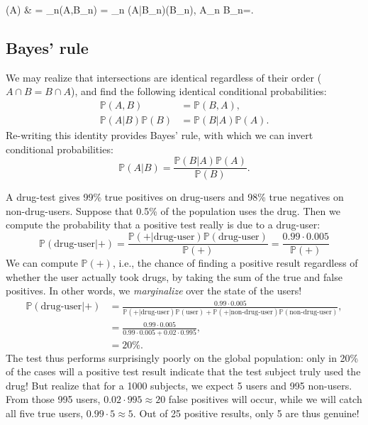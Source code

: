 \documentclass{article}
\begin{document}
\begin{mymathbox}[ams align, title={Law of total probability, when $\Omega$ is split wholly into $n$ portions}, colframe=blue!30!black, center title]
	(A) & = \sum_n(A,B_n) = \sum_n (A|B_n)(B_n), \quad \forall A\in\Omega{}\bigcup_n B_n=\Omega.
\end{mymathbox}

\subsection{Bayes' rule}
We may realize that intersections are identical regardless of their order ($A\cap B=B\cap A$), and find the following identical conditional probabilities:
\begin{align}
    \mathbb{P}(A,B) &=\mathbb{P}(B,A), \\
    \mathbb{P}(A|B)\mathbb{P}(B) &= \mathbb{P}(B|A)\mathbb{P}(A).
\end{align}
Re-writing this identity provides Bayes' rule, with which we can invert conditional probabilities:
\begin{equation}
    \mathbb{P}(A|B) = \frac{\mathbb{P}(B|A)\mathbb{P}(A)}{\mathbb{P}(B)}.
\end{equation}
\begin{testexample}
    A drug-test gives 99\% true positives on drug-users and 98\% true negatives on non-drug-users. Suppose that 0.5\% of the population uses the drug. Then we compute the probability that a positive test really is due to a drug-user:
    \begin{equation}
        \mathbb{P}(\text{drug-user}|+) = \frac{\mathbb{P}(+|\text{drug-user})\mathbb{P}(\text{drug-user})}{ \mathbb{P}(+) } = \frac{0.99\cdot0.005}{\mathbb{P}(+)}
    \end{equation}
    We can compute $\mathbb{P}(+)$, i.e., the chance of finding a positive result regardless of whether the user actually took drugs, by taking the sum of the true and false positives. In other words, we \textit{marginalize} over the state of the users!
    \begin{align}
        \mathbb{P}(\text{drug-user}|+)& = \frac{0.99\cdot0.005}{\mathbb{P}(+|\text{drug-user})\mathbb{P}(\text{user})+\mathbb{P}(+|\text{non-drug-user})\mathbb{P}(\text{non-drug-user})},\\
        &=\frac{0.99\cdot0.005}{0.99\cdot0.005+0.02\cdot 0.995},\\
        &=20\%.
    \end{align}
    The test thus performs surprisingly poorly on the global population: only in 20\% of the cases will a positive test result indicate that the test subject truly used the drug! But realize that for a 1000 subjects, we expect 5 users and 995 non-users. From those 995 users, $0.02\cdot995\approx 20$ false positives will occur, while we will catch all five true users, $0.99\cdot5\approx 5$. Out of 25 positive results, only 5 are thus genuine!
\end{testexample}
\end{document}
